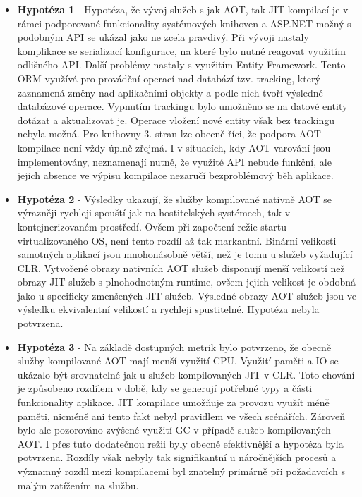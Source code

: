 \begin{itemize}
  \item \textbf{Hypotéza 1} - Hypotéza, že vývoj služeb s jak AOT, tak JIT kompilací je v rámci podporované funkcionality systémových knihoven a ASP.NET možný s podobným API se ukázal jako ne zcela pravdivý. Při vývoji nastaly komplikace se serializací konfigurace, na které bylo nutné reagovat využitím odlišného API. Další problémy nastaly s využitím Entity Framework. Tento ORM využívá pro provádění operací nad databází tzv. tracking, který zaznamená změny nad aplikačními objekty a podle nich tvoří výsledné databázové operace. Vypnutím trackingu bylo umožněno se na datové entity dotázat a aktualizovat je. Operace vložení nové entity však bez trackingu nebyla možná. Pro knihovny 3. stran lze obecně říci, že podpora AOT kompilace není vždy úplně zřejmá. I v situacích, kdy AOT varování jsou implementovány, neznamenají nutně, že využité API nebude funkční, ale jejich absence ve výpisu kompilace nezaručí bezproblémový běh aplikace.
  \item \textbf{Hypotéza 2} - Výsledky ukazují, že služby kompilované nativně AOT se výrazněji rychleji spouští jak na hostitelských systémech, tak v kontejnerizovaném prostředí. Ovšem při započtení režie startu virtualizovaného OS, není tento rozdíl až tak markantní. Binární velikosti samotných aplikací jsou mnohonásobně větší, než je tomu u služeb vyžadující CLR. Vytvořené obrazy nativních AOT služeb disponují menší velikostí než obrazy JIT služeb s plnohodnotným runtime, ovšem jejich velikost je obdobná jako u specificky zmenšených JIT služeb. Výsledné obrazy AOT služeb jsou ve výsledku ekvivalentní velikostí a rychleji spustitelné. Hypotéza nebyla potvrzena.
  \item \textbf{Hypotéza 3} - Na základě dostupných metrik bylo potvrzeno, že obecně služby kompilované AOT mají menší využití CPU. Využití paměti a IO se ukázalo být srovnatelné jak u služeb kompilovaných JIT v CLR. Toto chování je způsobeno rozdílem v době, kdy se generují potřebné typy a části funkcionality aplikace. JIT kompilace umožňuje za provozu využít méně paměti, nicméně ani tento fakt nebyl pravidlem ve všech scénářích. Zároveň bylo ale pozorováno zvýšené využití GC v případě služeb kompilovaných AOT. I přes tuto dodatečnou režii byly obecně efektivnější a hypotéza byla potvrzena. Rozdíly však nebyly tak signifikantní u náročnějších procesů a významný rozdíl mezi kompilacemi byl znatelný primárně při požadavcích s malým zatížením na službu.
\end{itemize}